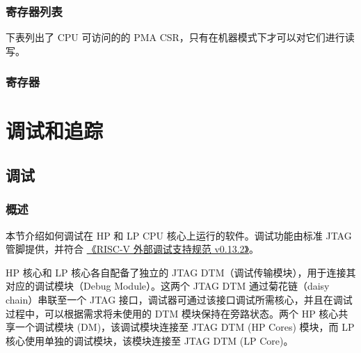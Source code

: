 \documentclass[main\_\_CN.tex]{subfiles}
\begin{document}

\newpage
\hypertarget{riscvcpu-pma-reg-summ}{}
\subsubsection{寄存器列表}
\label{sec:riscvcpu-pma-reg-summ}

下表列出了 CPU 可访问的的 PMA CSR，只有在机器模式下才可以对它们进行读写。




\subsubsection{寄存器}
\label{sec:riscvcpu-pma-reg-desc}



\newpage
\section{调试和追踪}


\subsection{调试}
\label{sec:riscvcpu-dbg}

\subsubsection{概述}
\label{sec:riscvcpu-dbg-overview}

本节介绍如何调试在 HP 和 LP CPU 核心上运行的软件。调试功能由标准 JTAG 管脚提供，并符合 \href{https://riscv.org/wp-content/uploads/2019/03/riscv-debug-release.pdf}{《RISC-V 外部调试支持规范 v0.13.2》}。

HP 核心和 LP 核心各自配备了独立的 JTAG DTM（调试传输模块），用于连接其对应的调试模块（Debug Module）。这两个 JTAG DTM 通过菊花链（daisy chain）串联至一个 JTAG 接口，调试器可通过该接口调试所需核心，并且在调试过程中，可以根据需求将未使用的 DTM 模块保持在旁路状态。两个 HP 核心共享一个调试模块 (DM)，该调试模块连接至 JTAG DTM (HP Cores) 模块，而 LP 核心使用单独的调试模块，该模块连接至 JTAG DTM (LP Core)。
\end{document}
